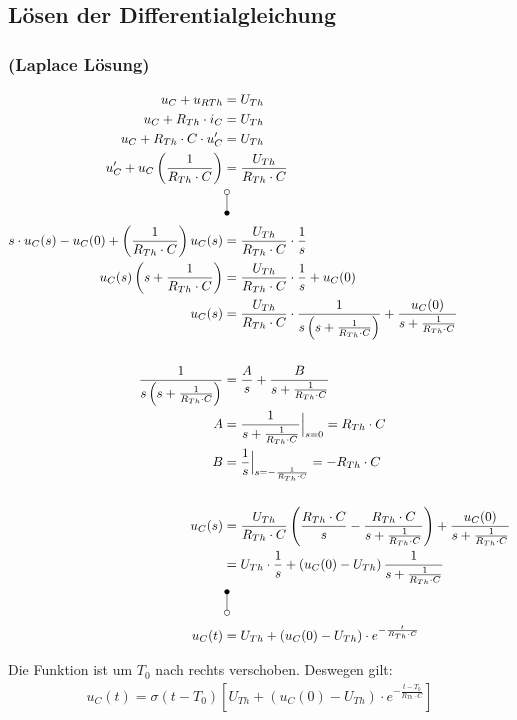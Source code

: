 \documentclass[11pt]{scrartcl}
\newcommand{\vlaplace}[1][]{\mbox{\setlength{\unitlength}{0.1em}%
    \begin{picture}(10,20)%
      \put(3,2){\circle{4}}%
      \put(3,4){\line(0,1){12}}%
      \put(3,18){\circle*{4}}%
      \put(10,7){#1}
    \end{picture}%
  }%
}%
\newcommand{\vLaplace}[1][]{\mbox{\setlength{\unitlength}{0.1em}%
    \begin{picture}(10,20)%
      \put(3,2){\circle*{4}}%
      \put(3,4){\line(0,1){12}}%
      \put(3,18){\circle{4}}%
      \put(10,7){#1}
    \end{picture}%
  }%
}%
\begin{document}
\subsection{Lösen der Differentialgleichung}
\subsubsection{(Laplace Lösung)}
\setlength{\jot}{12pt}
\begin{align*}
  u_C + u_{RTh} &= U_{Th} \\
  u_C + R_{Th} \cdot i_C &= U_{Th} \\
  u_C + R_{Th} \cdot C \cdot u_C^{\prime} &= U_{Th} \\
  u_C^{\prime} + u_C \left( \frac{1}{R_{Th} \cdot C}\right) &= \frac{U_{Th}}{R_{Th} \cdot C} \\
                &\vLaplace \\
  s \cdot u_C(s) - u_C (0) + \left( \frac{1}{R_{Th} \cdot C} \right) u_C(s) &= \frac{U_{Th}}{R_{Th} \cdot C} \cdot \frac{1}{s} \\
  u_C(s) \left(s + \frac{1}{R_{Th} \cdot C}\right) &= \frac{U_{Th}}{R_{Th} \cdot C} \cdot \frac{1}{s} + u_C(0) \\
  u_C(s) &= \frac{U_{Th}}{R_{Th} \cdot C} \cdot\frac{1}{s \left( s + \frac{1}{R_{Th} \cdot C} \right)} + \frac{u_C(0)}{s + \frac{1}{R_{Th} \cdot C}} \\ \\
  \frac{1}{s\left(s + \frac{1}{R_{Th} \cdot C} \right)} &= \frac{A}{s} + \frac{B}{s + \frac{1}{R_{Th}\cdot C}} \\
  A &= \frac{1}{s + \frac{1}{R_{Th} \cdot C}} \Big|_{s=0} = R_{Th} \cdot C \\
  B &= \frac{1}{s} \Big|_{s=-\frac{1}{R_{Th} \cdot C}} = - R_{Th} \cdot C \\ \\
  u_C(s) &= \frac{U_{Th}}{R_{Th} \cdot C} \left( \frac{R_{Th} \cdot C}{s} - \frac{R_{Th} \cdot C}{s + \frac{1}{R_{Th} \cdot C}}\right) + \frac{u_C(0)}{s + \frac{1}{R_{Th} \cdot C}} \\
                &= U_{Th} \cdot \frac{1}{s} + \left( u_C(0) - U_{Th} \right) \frac{1}{s + \frac{1}{R_{Th} \cdot C}} \\
                &\vlaplace \\
  u_C(t) &= U_{Th} + (u_C(0) - U_{Th}) \cdot e^{-\frac{t}{R_{Th} \cdot C}} \\
\end{align*}

Die Funktion ist um $T_0$ nach rechts verschoben. Deswegen gilt:
\begin{align*}
  u_C(t) = \sigma(t-T_0) \left[ U_{Th} + (u_C(0) - U_{Th}) \cdot e^{-\frac{t-T_0}{R_{Th} \cdot C}} \right]
\end{align*}
\end{document}

